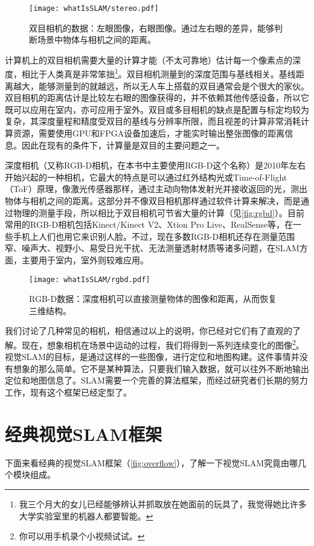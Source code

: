 \begin{figure}[!ht]
	\centering
	\texttt{[image: whatIsSLAM/stereo.pdf]}
	\caption{双目相机的数据：左眼图像，右眼图像。通过左右眼的差异，能够判断场景中物体与相机之间的距离。}
	\label{fig:stereo}
\end{figure}

计算机上的双目相机需要大量的计算才能（不太可靠地）估计每一个像素点的深度，相比于人类真是非常笨拙\footnote{我三个月大的女儿已经能够辨认并抓取放在她面前的玩具了，我觉得她比许多大学实验室里的机器人都要智能。}。双目相机测量到的深度范围与基线相关。基线距离越大，能够测量到的就越远，所以无人车上搭载的双目通常会是个很大的家伙。双目相机的距离估计是比较左右眼的图像获得的，并不依赖其他传感设备，所以它既可以应用在室内，亦可应用于室外。双目或多目相机的缺点是配置与标定均较为复杂，其深度量程和精度受双目的基线与分辨率所限，而且视差的计算非常消耗计算资源，需要使用GPU和FPGA设备加速后，才能实时输出整张图像的距离信息。因此在现有的条件下，计算量是双目的主要问题之一。

深度相机（又称RGB-D相机，在本书中主要使用RGB-D这个名称）是2010年左右开始兴起的一种相机，它最大的特点是可以通过红外结构光或Time-of-Flight（ToF）原理，像激光传感器那样，通过主动向物体发射光并接收返回的光，测出物体与相机之间的距离。这部分并不像双目相机那样通过软件计算来解决，而是通过物理的测量手段，所以相比于双目相机可节省大量的计算（见\autoref{fig:rgbd}）。目前常用的RGB-D相机包括Kinect/Kinect V2、Xtion Pro Live、RealSense等，在一些手机上人们也用它来识别人脸。不过，现在多数RGB-D相机还存在测量范围窄、噪声大、视野小、易受日光干扰、无法测量透射材质等诸多问题，在SLAM方面，主要用于室内，室外则较难应用。

\begin{figure}[!ht]
	\centering
	\texttt{[image: whatIsSLAM/rgbd.pdf]}
	\caption{RGB-D数据：深度相机可以直接测量物体的图像和距离，从而恢复三维结构。}
	\label{fig:rgbd}
\end{figure}

我们讨论了几种常见的相机，相信通过以上的说明，你已经对它们有了直观的了解。现在，想象相机在场景中运动的过程，我们将得到一系列连续变化的图像\footnote{你可以用手机录个小视频试试。}。视觉SLAM的目标，是通过这样的一些图像，进行定位和地图构建。这件事情并没有想象的那么简单。它不是某种算法，只要我们输入数据，就可以往外不断地输出定位和地图信息了。SLAM需要一个完善的算法框架，而经过研究者们长期的努力工作，现有这个框架已经定型了。

\section{经典视觉SLAM框架}
下面来看经典的视觉SLAM框架（\autoref{fig:overflow}），了解一下视觉SLAM究竟由哪几个模块组成。

